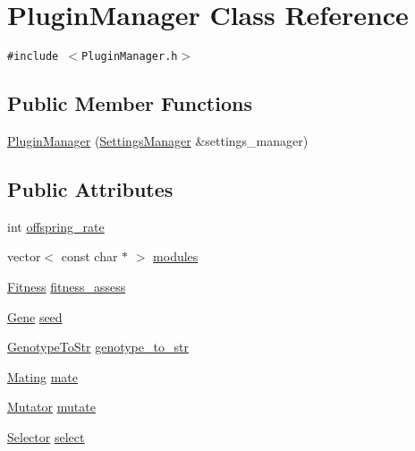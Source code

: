 \hypertarget{classPluginManager}{
\section{PluginManager Class Reference}
\label{classPluginManager}
}
{\tt \#include $<$PluginManager.h$>$}

\subsection*{Public Member Functions}
\begin{CompactItemize}
\item 
\hyperlink{classPluginManager_59e57fdbde1831ee0f568f20be6775b1}{PluginManager} (\hyperlink{classSettingsManager}{SettingsManager} \&settings\_\-manager)
\end{CompactItemize}
\subsection*{Public Attributes}
\begin{CompactItemize}
\item 
int \hyperlink{classPluginManager_c09d5dee99948f43a349e4bcecfbe578}{offspring\_\-rate}
\item 
vector$<$ const char $\ast$ $>$ \hyperlink{classPluginManager_f13751fb9b39023b1fd176768def6826}{modules}
\item 
\hyperlink{classPluginManager_74536c0cfee914f6b592d185e9d8b004}{Fitness} \hyperlink{classPluginManager_93440ee4d3657d57b795b1cf2c136871}{fitness\_\-assess}
\item 
\hyperlink{classPluginManager_fbd27663f74cd22c439cc0a365094d79}{Gene} \hyperlink{classPluginManager_d5baa7b8d770b48f3dbf9bcd90817ceb}{seed}
\item 
\hyperlink{classPluginManager_ed40a705dc64b5ebe14b9a29f2828241}{GenotypeToStr} \hyperlink{classPluginManager_5cdf0f6cb22a6e4a8f188bafd74d2d88}{genotype\_\-to\_\-str}
\item 
\hyperlink{classPluginManager_b2707706d35a521a1c9c0c525b20b3a9}{Mating} \hyperlink{classPluginManager_6df542bda57cd82fc11dd2b0cc59605b}{mate}
\item 
\hyperlink{classPluginManager_00afabd8a9bbe0fd0c5b90294dc96a45}{Mutator} \hyperlink{classPluginManager_d64faacd5d3222e068cd3a6632e75d7e}{mutate}
\item 
\hyperlink{classPluginManager_64f7347436213b5c961891c7035947cc}{Selector} \hyperlink{classPluginManager_01e6b62a96bea7b38b5ab83513037e6c}{select}
\end{CompactItemize}
